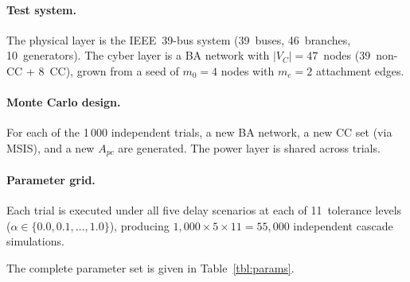 \documentclass[a4paper,fleqn]{cas-dc}
\begin{document}
\paragraph{Test system.}
The physical layer is the IEEE~39-bus system (39~buses, 46~branches,
10~generators).  The cyber layer is a BA network with
$|V_C|=47$~nodes (39~non-CC + 8~CC), grown from a seed of
$m_0=4$ nodes with $m_e=2$ attachment edges.

\paragraph{Monte Carlo design.}
For each of the 1\,000 independent trials, a new BA network, a new CC
set (via MSIS), and a new $A_{pc}$ are generated.  The power layer is
shared across trials.

\paragraph{Parameter grid.}
Each trial is executed under all five delay scenarios at each of
11~tolerance levels ($\alpha\in\{0.0,0.1,\dots,1.0\}$), producing
$1{,}000\times5\times11=55{,}000$ independent cascade simulations.

The complete parameter set is given in Table~\ref{tbl:params}.
\end{document}
